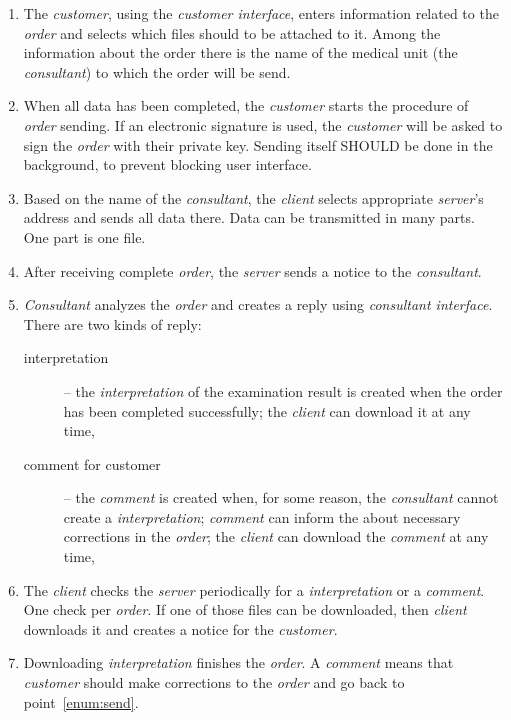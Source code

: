 \documentclass[a4paper]{article}
\begin{document}
\begin{enumerate}
  \item The \emph{customer}, using the \emph{customer interface}, enters information
  related to the \emph{order} and selects which files should to be attached to it.
  Among the information about the order there is the name of the medical unit
  (the \emph{consultant}) to which the order will be send.

  \item \label{enum:send} When all data has been completed, the \emph{customer} starts the
  procedure of \emph{order} sending. If an electronic signature is used, the
  \emph{customer} will be asked to sign the \emph{order} with their private key. Sending
  itself SHOULD be done in the background, to prevent blocking user interface. 
  
  \item Based on the name of the \emph{consultant}, the \emph{client} selects 
  appropriate \emph{server}’s address and sends all data there. Data can be transmitted in
  many parts. One part is one file.

  \item After receiving complete \emph{order}, the \emph{server} sends a notice to the
  \emph{consultant}.

  \item \emph{Consultant} analyzes the \emph{order} and creates a reply using 
  \emph{consultant interface}. There are two kinds of reply:
  \begin{description}
    \item[interpretation] -- the \emph{interpretation} of the examination result is created
    when the order has been completed successfully; the \emph{client} can
    download it at any time,
    \item[comment for customer] -- the \emph{comment} is created when, for some reason, the
    \emph{consultant} cannot create a \emph{interpretation};
    \emph{comment} can inform the  about necessary
    corrections in the \emph{order}; the \emph{client} can download the \emph{comment} 
    at any time,
  \end{description}

  \item The \emph{client} checks the \emph{server} periodically for a \emph{interpretation}
  or a \emph{comment}. One check per \emph{order}. If one of those files can be downloaded,
  then \emph{client} downloads it and creates a notice for the \emph{customer}.
 
  \item Downloading \emph{interpretation} finishes the \emph{order}. A \emph{comment} means
  that \emph{customer} should make corrections to the \emph{order} and go back to
  \mbox{point \ref{enum:send}}.
\end{enumerate}
\end{document}
